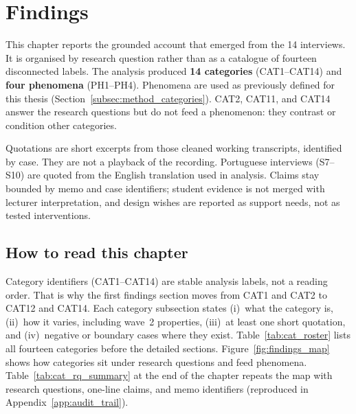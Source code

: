 
%

\chapter{Findings}
\label{cha:findings}

This chapter reports the grounded account that emerged from the 14 interviews. It is organised by research question rather than as a catalogue of fourteen disconnected labels. The analysis produced \textbf{14 categories} (CAT1--CAT14) and \textbf{four phenomena} (PH1--PH4). Phenomena are used as previously defined for this thesis (Section~\ref{subsec:method_categories}). CAT2, CAT11, and CAT14 answer the research questions but do not feed a phenomenon: they contrast or condition other categories.

Quotations are short excerpts from those cleaned working transcripts, identified by case. They are not a playback of the recording. Portuguese interviews (S7--S10) are quoted from the English translation used in analysis. Claims stay bounded by memo and case identifiers; student evidence is not merged with lecturer interpretation, and design wishes are reported as support needs, not as tested interventions.

\section{How to read this chapter}
\label{sec:findings_how}

Category identifiers (CAT1--CAT14) are stable analysis labels, not a reading order. That is why the first findings section moves from CAT1 and CAT2 to CAT12 and CAT14. Each category subsection states (i)~what the category is, (ii)~how it varies, including wave~2 properties, (iii)~at least one short quotation, and (iv)~negative or boundary cases where they exist. Table~\ref{tab:cat_roster} lists all fourteen categories before the detailed sections. Figure~\ref{fig:findings_map} shows how categories sit under research questions and feed phenomena. Table~\ref{tab:cat_rq_summary} at the end of the chapter repeats the map with research questions, one-line claims, and memo identifiers (reproduced in Appendix~\ref{app:audit_trail}).

